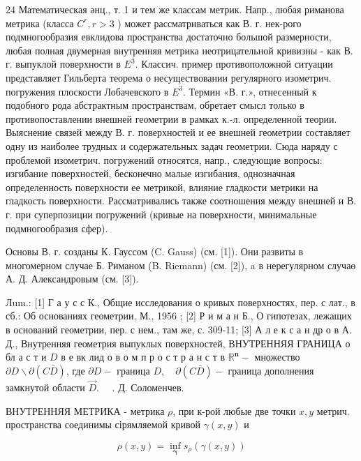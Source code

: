 \documentclass[10pt]{article}
\begin{document}
24 Математическая әнц., т. 1 и тем же классам метрик. Напр., любая риманова метрика (класса $C^{r}, r>3$ ) может рассматриваться как В. г. нек-рого подмногообразия евклидова пространства достаточно большой размерности, любая полная двумерная внутренняя метрика неотрицательной кривизны - как В. г. выпуклой поверхности в $E^{3}$. Классич. пример противоположной ситуации представляет Гильберта теорема о несуществовании регулярного изометрич. погружения плоскости Лобачевского в $E^{3}$. Термин «В. г.», отнесенный к подобного рода абстрактным пространствам, обретает смысл только в противопоставлении внешней геометрии в рамках к.-л. определенной теории. Выяснение связей между В. г. поверхностей и ее внешней геометрии составляет одну из наиболее трудных и содержательных задач геометрии. Сюда наряду с проблемой изометрич. погружений относятся, напр., следующие вопросы: изгибание поверхностей, бесконечно малые изгибания, однозначная определенность поверхности ее метрикой, влияние гладкости метрики на гладкость поверхности. Рассматривались также соотношения между внешней и В. г. при суперпозиции погружений (кривые на поверхности, минимальные подмногообразия сфер).



Основы В. г. созданы К. Гауссом (C. Gauss) (см. [1]). Они развиты в многомерном случае Б. Риманом (B. Riemann) (см. [2]), a в нерегулярном случаө А. Д. Александровым (см. [3]).



Лum.: [1] Г а у с с К., Общие исследования о кривых поверхностях, пер. с лат., в сб.: Об основаниях геометрии, М., 1956 ; [2] Р и м а н Б., О гипотезах, лежащих в оснований геометрии, пер. с нем., там же, с. 309-11; [3] А л е к с а н др о в А. Д., Внутренняя геометрия выпуклых поверхностей, ВНУТРЕННЯЯ ГРАНИЦА о бл а с т и $D$ в е вк лид о в о м п р о с т р а н с т в $\mathbb{R}^{\boldsymbol{n}}-$ множество $\partial D \backslash \partial(C \bar{D})$, где $\partial D-$ граница $D, \quad \partial(C \bar{D})-$ граница дополнения замкнутой области $\vec{D}$. $\quad$. Д. Соломенчев.



ВНУТРЕННЯЯ МЕТРИКА - метрика $\rho$, при к-рой любые две точки $x, y$ метрич. пространства соединимы сірямляемой кривой $\gamma(x, y)$ и



\[

\rho(x, y)=\inf _{\boldsymbol{\gamma}} s_{\rho}(\gamma(x, y))

\]
\end{document}
